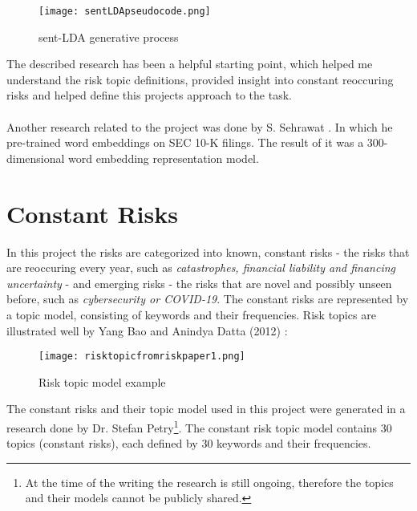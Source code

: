 \begin{figure}[H]
\center
\texttt{[image: sentLDApseudocode.png]}
\caption{sent-LDA generative process \cite{riskpaper1}}
\label{fig:sentLDAgen}
\end{figure}

The described research has been a helpful starting point, which helped me understand the risk topic definitions, provided insight into constant reoccuring risks and helped define this projects approach to the task.
\\\\
Another research related to the project was done by S. Sehrawat \cite{10kwordembeddings}. In which he pre-trained word embeddings on SEC 10-K filings. The result of it was a 300-dimensional word embedding representation model.

\section{Constant Risks}
In this project the risks are categorized into known, constant risks - the risks that are reoccuring every year, such as \textit{catastrophes, financial liability and financing uncertainty} - and emerging risks - the risks that are novel and possibly unseen before, such as \textit{cybersecurity or COVID-19}. The constant risks are represented by a topic model, consisting of keywords and their frequencies. Risk topics are illustrated well by Yang Bao and Anindya Datta (2012) \cite{riskpaper1}:

\begin{figure}[H]
\center
\texttt{[image: risktopicfromriskpaper1.png]}
\caption{Risk topic model example \cite{riskpaper1}}
\end{figure}

The constant risks and their topic model used in this project were generated in a research done by Dr. Stefan Petry\footnote{At the time of the writing the research is still ongoing, therefore the topics and their models cannot be publicly shared.}. The constant risk topic model contains 30 topics (constant risks), each defined by 30 keywords and their frequencies.